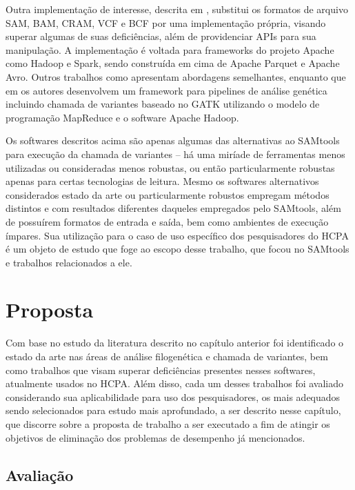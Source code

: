 \documentclass[cic,tc]{iiufrgs}
\begin{document}
Outra implementação de interesse, descrita em \cite{massie2013adam}, substitui
os formatos de arquivo SAM, BAM, CRAM, VCF e BCF por uma implementação própria,
visando superar algumas de suas deficiências, além de providenciar APIs para
sua manipulação. A implementação é voltada para frameworks do projeto Apache
como Hadoop e Spark, sendo construída em cima de Apache Parquet e Apache Avro.
Outros trabalhos como \cite{boufea2017managing} apresentam abordagens
semelhantes, enquanto que em \cite{decap2015halvade} os autores desenvolvem um
framework para pipelines de análise genética incluindo chamada de variantes
baseado no GATK utilizando o modelo de programação MapReduce e o software
Apache Hadoop.

Os softwares descritos acima são apenas algumas das alternativas ao SAMtools
para execução da chamada de variantes -- há uma miríade de ferramentas menos
utilizadas ou consideradas menos robustas, ou então particularmente robustas
apenas para certas tecnologias de leitura. Mesmo os softwares alternativos
considerados estado da arte ou particularmente robustos empregam métodos
distintos e com resultados diferentes daqueles empregados pelo SAMtools, além
de possuírem formatos de entrada e saída, bem como ambientes de execução
ímpares. Sua utilização para o caso de uso específico dos pesquisadores do HCPA
é um objeto de estudo que foge ao escopo desse trabalho, que focou no SAMtools
e trabalhos relacionados a ele.

%
%
%
%

\chapter{Proposta}
\label{chap:mod}

Com base no estudo da literatura descrito no capítulo anterior foi identificado
o estado da arte nas áreas de análise filogenética e chamada de variantes, bem
como trabalhos que visam superar deficiências presentes nesses softwares,
atualmente usados no HCPA. Além disso, cada um desses trabalhos foi avaliado
considerando sua aplicabilidade para uso dos pesquisadores, os mais adequados
sendo selecionados para estudo mais aprofundado, a ser descrito nesse capítulo,
que discorre sobre a proposta de trabalho a ser executado a fim de atingir os
objetivos de eliminação dos problemas de desempenho já mencionados.

\section{Avaliação}
\label{sec:eval}
\end{document}
